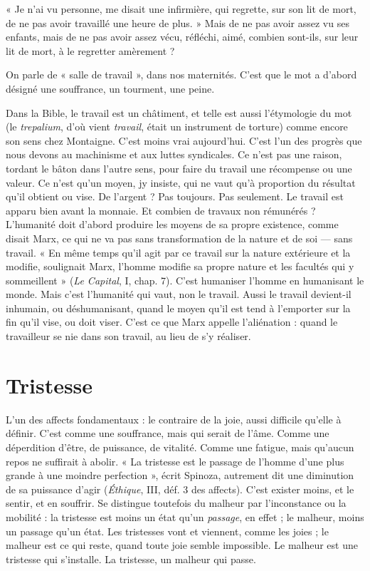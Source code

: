 « Je n’ai vu personne, me disait une infirmière, qui regrette, sur son lit de
mort, de ne pas avoir travaillé une heure de plus. » Mais de ne pas avoir assez
vu ses enfants, mais de ne pas avoir assez vécu, réfléchi, aimé, combien sont-ils,
sur leur lit de mort, à le regretter amèrement ?

On parle de « salle de travail », dans nos maternités. C’est que le mot a
d’abord désigné une souffrance, un tourment, une peine.

Dans la Bible, le travail est un châtiment, et telle est aussi l’étymologie du
mot (le {\it trepalium}, d’où vient {\it travail}, était un instrument de torture) comme
encore son sens chez Montaigne. C’est moins vrai aujourd’hui. C’est l’un des
progrès que nous devons au machinisme et aux luttes syndicales. Ce n’est pas
une raison, tordant le bâton dans l’autre sens, pour faire du travail une récompense
ou une valeur. Ce n’est qu’un moyen, jy insiste, qui ne vaut qu’à proportion
du résultat qu’il obtient ou vise. De l’argent ? Pas toujours. Pas seulement.
Le travail est apparu bien avant la monnaie. Et combien de travaux non
rémunérés ? L’humanité doit d’abord produire les moyens de sa propre existence,
comme disait Marx, ce qui ne va pas sans transformation de la nature et
de soi — sans travail. « En même temps qu'il agit par ce travail sur la nature extérieure
et la modifie, soulignait Marx, l’homme modifie sa propre nature et les
facultés qui y sommeillent » ({\it Le Capital}, I, chap. 7). C’est humaniser l’homme en
humanisant le monde. Mais c’est l'humanité qui vaut, non le travail. Aussi le travail
devient-il inhumain, ou déshumanisant, quand le moyen qu’il est tend à
l'emporter sur la fin qu’il vise, ou doit viser. C’est ce que Marx appelle
l'aliénation : quand le travailleur se nie dans son travail, au lieu de s’y réaliser.

\section{Tristesse}
L'un des affects fondamentaux : le contraire de la joie, aussi difficile
qu’elle à définir. C’est comme une souffrance, mais qui
serait de l’âme. Comme une déperdition d’être, de puissance, de vitalité. Comme
une fatigue, mais qu'aucun repos ne suffirait à abolir. « La tristesse est le passage
de l’homme d’une plus grande à une moindre perfection », écrit Spinoza, autrement
dit une diminution de sa puissance d’agir ({\it Éthique}, III, déf. 3 des affects).
C'est exister moins, et le sentir, et en souffrir. Se distingue toutefois du malheur
par l’inconstance ou la mobilité : la tristesse est moins un état qu’un {\it passage}, en
effet ; le malheur, moins un passage qu’un état. Les tristesses vont et viennent,
comme les joies ; le malheur est ce qui reste, quand toute joie semble impossible.
Le malheur est une tristesse qui s’installe. La tristesse, un malheur qui passe.

